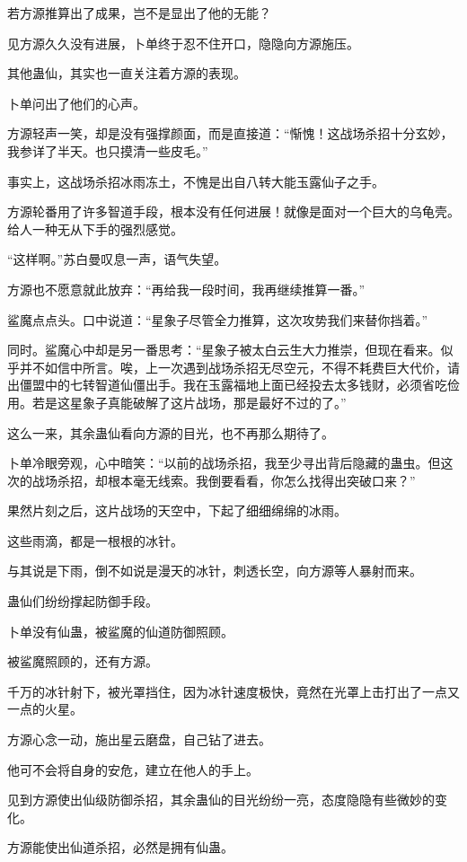 \begin{this_body}
若方源推算出了成果，岂不是显出了他的无能？

见方源久久没有进展，卜单终于忍不住开口，隐隐向方源施压。

其他蛊仙，其实也一直关注着方源的表现。

卜单问出了他们的心声。

方源轻声一笑，却是没有强撑颜面，而是直接道：“惭愧！这战场杀招十分玄妙，我参详了半天。也只摸清一些皮毛。”

事实上，这战场杀招冰雨冻土，不愧是出自八转大能玉露仙子之手。

方源轮番用了许多智道手段，根本没有任何进展！就像是面对一个巨大的乌龟壳。给人一种无从下手的强烈感觉。

“这样啊。”苏白曼叹息一声，语气失望。

方源也不愿意就此放弃：“再给我一段时间，我再继续推算一番。”

鲨魔点点头。口中说道：“星象子尽管全力推算，这次攻势我们来替你挡着。”

同时。鲨魔心中却是另一番思考：“星象子被太白云生大力推崇，但现在看来。似乎并不如信中所言。唉，上一次遇到战场杀招无尽空元，不得不耗费巨大代价，请出僵盟中的七转智道仙僵出手。我在玉露福地上面已经投去太多钱财，必须省吃俭用。若是这星象子真能破解了这片战场，那是最好不过的了。”

这么一来，其余蛊仙看向方源的目光，也不再那么期待了。

卜单冷眼旁观，心中暗笑：“以前的战场杀招，我至少寻出背后隐藏的蛊虫。但这次的战场杀招，却根本毫无线索。我倒要看看，你怎么找得出突破口来？”

果然片刻之后，这片战场的天空中，下起了细细绵绵的冰雨。

这些雨滴，都是一根根的冰针。

与其说是下雨，倒不如说是漫天的冰针，刺透长空，向方源等人暴射而来。

蛊仙们纷纷撑起防御手段。

卜单没有仙蛊，被鲨魔的仙道防御照顾。

被鲨魔照顾的，还有方源。

千万的冰针射下，被光罩挡住，因为冰针速度极快，竟然在光罩上击打出了一点又一点的火星。

方源心念一动，施出星云磨盘，自己钻了进去。

他可不会将自身的安危，建立在他人的手上。

见到方源使出仙级防御杀招，其余蛊仙的目光纷纷一亮，态度隐隐有些微妙的变化。

方源能使出仙道杀招，必然是拥有仙蛊。


\end{this_body}
